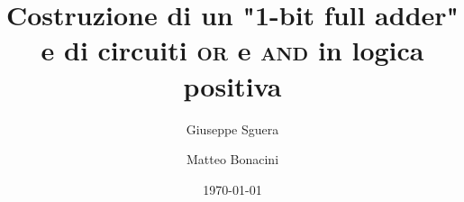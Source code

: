 \documentclass[11pt, a4paper, twoside]{article}
\author{Giuseppe Sguera \\ \getenv{MAT1} \and Matteo Bonacini \\ \getenv{MAT2}}
\date{\today}
\title{Costruzione di un "1-bit full adder" e di circuiti \textsc{or} e \textsc{and} in logica positiva}
\begin{document}

    \maketitle

    

    
    
    
    
    \newpage
    \relax
    

%
\end{document}
